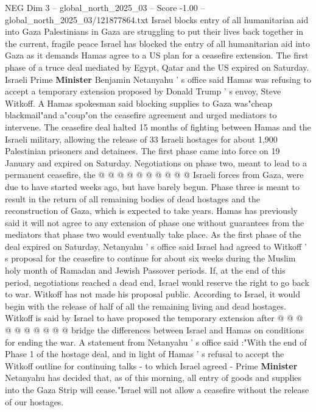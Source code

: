 \begin{textsample}{NEG Dim 3 – global\_north\_2025\_03 – Score -1.00 – global\_north\_2025\_03/121877864.txt}  \label{ex:f3_neg_434}
Israel blocks entry of all humanitarian aid into Gaza Palestinians in Gaza are struggling to put their lives back together in the current, fragile peace Israel has blocked the entry of all humanitarian aid into Gaza as it demands Hamas agree to a US plan for a ceasefire extension.
The first phase of a truce deal mediated by Egypt, Qatar and the US expired on Saturday.
Israeli Prime \textbf{Minister} Benjamin Netanyahu ' s office said Hamas was refusing to accept a temporary extension proposed by Donald Trump ' s envoy, Steve Witkoff.
A Hamas spokesman said blocking supplies to Gaza was"cheap blackmail"and a"coup"on the ceasefire agreement and urged mediators to intervene.
The ceasefire deal halted 15 months of fighting between Hamas and the Israeli military, allowing the release of 33 Israeli hostages for about 1,900 Palestinian prisoners and detainees.
The first phase came into force on 19 January and expired on Saturday.
Negotiations on phase two, meant to lead to a permanent ceasefire, the @ @ @ @ @ @ @ @ @ @ Israeli forces from Gaza, were due to have started weeks ago, but have barely begun.
Phase three is meant to result in the return of all remaining bodies of dead hostages and the reconstruction of Gaza, which is expected to take years.
Hamas has previously said it will not agree to any extension of phase one without guarantees from the mediators that phase two would eventually take place.
As the first phase of the deal expired on Saturday, Netanyahu ' s office said Israel had agreed to Witkoff ' s proposal for the ceasefire to continue for about six weeks during the Muslim holy month of Ramadan and Jewish Passover periods.
If, at the end of this period, negotiations reached a dead end, Israel would reserve the right to go back to war.
Witkoff has not made his proposal public.
According to Israel, it would begin with the release of half of all the remaining living and dead hostages.
Witkoff is said by Israel to have proposed the temporary extension after @ @ @ @ @ @ @ @ @ @ bridge the differences between Israel and Hamas on conditions for ending the war.
A statement from Netanyahu ' s office said :"With the end of Phase 1 of the hostage deal, and in light of Hamas ' s refusal to accept the Witkoff outline for continuing talks - to which Israel agreed - Prime \textbf{Minister} Netanyahu has decided that, as of this morning, all entry of goods and supplies into the Gaza Strip will cease."Israel will not allow a ceasefire without the release of our hostages.

\end{textsample}
